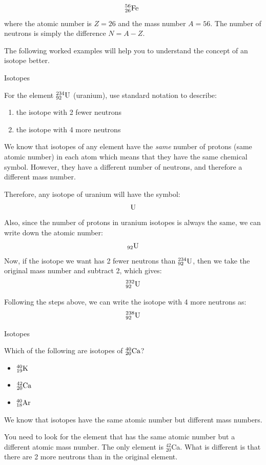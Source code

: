     \begin{equation}
    _{26}^{56}\mathrm{Fe}\phantom{\rule{4pt}{0ex}}
      \end{equation}
      \label{m38753*id255929}where the atomic number is $Z=26$\hspace{1ex} and the mass number $A=56$.
The number of neutrons is simply the difference $N=A-Z$.\par 
        \label{m38753*id257512}The following worked examples will help you to understand the concept of an isotope better.\par \pagebreak
\label{m38753*secfhsst!!!underscore!!!id400}\vspace{.5cm} 
\begin{wex}{Isotopes }{
For the element $^{234}_{92}{\rm U}$ (uranium), use standard notation to describe:
\begin{enumerate}
 \item the isotope with 2 fewer neutrons
 \item the isotope with 4 more neutrons
\end{enumerate}}

{
We know that isotopes of any element have the \emph{same} number
of protons (same atomic number) 
in each atom which means that they have the same chemical symbol. However, they have a different number of neutrons, and therefore a different mass number.\\}

{
Therefore, any isotope of uranium will have the symbol:
 $$
	\rm{U}
 $$
 Also, since the number of protons in uranium isotopes is always the same, we can write
 down the atomic number:
 $$
	_{92}\rm{U}
 $$ 
 Now, if the isotope we want has 2 fewer neutrons than $^{234}_{92}\rm{U}$, 
	then we take the original mass number and subtract 2, which gives:
 $$
	^{232}_{92}\rm{U}
 $$  

Following the steps above, we can write the isotope with 4 more neutrons as:
 $$
	^{238}_{92}\rm{U}
 $$} 
\end{wex}

\begin{wex}{Isotopes}
{ Which of the following are isotopes of $^{40}_{20}\rm{Ca}$?
\begin{itemize}
 \item $^{40}_{19}\rm{K}$
 \item $^{42}_{20}\rm{Ca}$
 \item $^{40}_{18}\rm{Ar}$
\end{itemize}}

{

We know that isotopes have the same atomic number but different mass numbers.\\}

{
You need to look for the element that has the same atomic number but a different atomic mass number. The only element is $^{42}_{20}$Ca. What is different is that there are 2 more neutrons than in the original element.
}
\end{wex}

